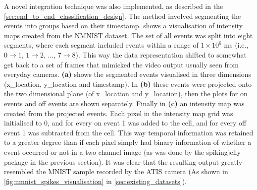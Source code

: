  A novel integration technique was also implemented, as described in the \cref{sec:end_to_end_classification_design}. The method involved segmenting the events into groups based on their timestamp.  shows a visualisation of intensity maps created from the NMNIST\cite{NMNIST} dataset. The set of all events was split into eight segments, where each segment included events within a range of $ 1 \times 10^6 $ ms (i.e., $ 0 \rightarrow 1 $, $ 1 \rightarrow 2 $, ..., $ 7 \rightarrow 8 $). This way the data representation shifted to somewhat get back to a set of frames that mimicked the video output usually seen from everyday cameras. \textbf{(a)} shows the segmented events visualised in three dimensions (x\_location, y\_location and timestamp). In \textbf{(b)} these events were projected onto the two dimensional plane (of x\_location and y\_location), then the plots for on events and off events are shown separately. Finally in \textbf{(c)} an intensity map was created from the projected events. Each pixel in the intensity map grid was initialised to 0, and for every on event 1 was added to the cell, and for every off event 1 was subtracted from the cell. This way temporal information was retained to a greater degree than if each pixel simply had binary information of whether a event occurred or not in a two channel image (as was done by the spikingjelly package\cite{SpikingJelly} in the previous section). It was clear that the resulting output greatly resembled the MNIST\cite{MNIST} sample recorded by the ATIS camera (As shown in \cref{fig:nmnist_spikes_visualisation} in \cref{sec:existing_datasets}).



